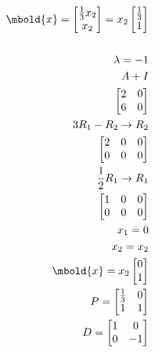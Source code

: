 \documentclass[12pt letter]{report}
\begin{document}
{\begin{enumerate}
\begin{align*}
            \mbold{x} = \begin{bmatrix} \frac{1}{3}x_2 \\ x_2 \end{bmatrix} = x_2 \begin{bmatrix} \frac{1}{3} \\ 1 \end{bmatrix}
            \\
            \\
            \lambda = -1                                                              \\
            A + I                                                                     \\
            \begin{bmatrix}
              2 & 0 \\
              6 & 0 \\
            \end{bmatrix}                                                            \\
            3R_1 - R_2  \rightarrow R_2                                               \\
            \begin{bmatrix}
              2 & 0 & 0 \\
              0 & 0 & 0 \\
            \end{bmatrix}
            \\
            \frac{1}{2}R_1 \to R_1                                                    \\
            \begin{bmatrix}
              1 & 0 & 0 \\
              0 & 0 & 0 \\
            \end{bmatrix}
            \\
            x_1 = 0                                                                   \\
            x_2 = x_2                                                                 \\
            \mbold{x} = x_2\begin{bmatrix} 0  \\ 1 \end{bmatrix}
            \\
            P = \begin{bmatrix}
                  \frac{1}{3} & 0 \\
                  1           & 1
                \end{bmatrix}                                                       \\
            D = \begin{bmatrix}
                  1 & 0  \\
                  0 & -1
                \end{bmatrix}
          \end{align*}
  \end{enumerate}
}
\end{document}
